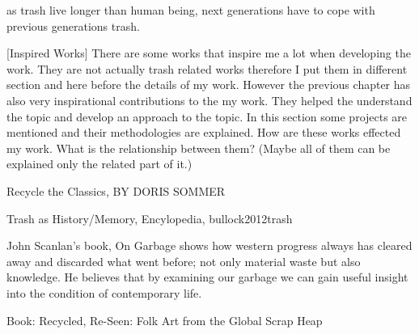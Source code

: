 





as trash live longer than human being, next generations have to cope with previous generations trash. 




[Inspired Works] There are some works that inspire me a lot when developing the work. They are not actually trash related works therefore I put them in different section and here before the details of my work. However the previous chapter has also very inspirational contributions to the my work. They helped the understand the topic and develop an approach to the topic. In this section some projects are mentioned and their methodologies are explained. How are these works effected my work. What is the relationship between them? (Maybe all of them can be explained only the related part of it.)




Recycle the Classics, BY DORIS SOMMER

Trash as History/Memory, Encylopedia, bullock2012trash

John Scanlan's book, On Garbage shows how western progress always has cleared away and discarded what went before; not only material waste but also knowledge. He believes that by examining our garbage we can gain useful insight into the condition of contemporary life.

Book: Recycled, Re-Seen: Folk Art from the Global Scrap Heap






